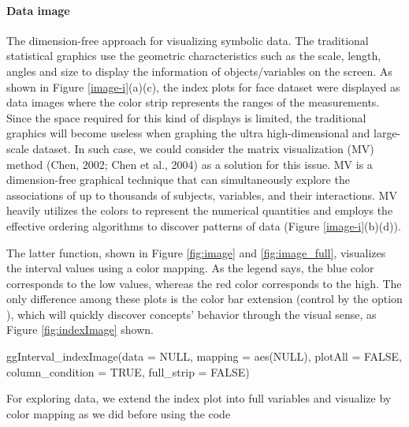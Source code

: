 \documentclass[article]{jss}
\begin{document}
 



\paragraph{Data image}
The dimension-free approach for visualizing symbolic data.
The traditional statistical graphics use the geometric
characteristics such as the scale, length, angles and size
to display the information of objects/variables on the
screen. As shown in Figure \ref{image-i}(a)(c), the index
plots for face dataset were displayed as data images where
the color strip represents the ranges of the measurements.
Since the space required for this kind of displays is
limited, the traditional graphics will become useless when
graphing the ultra high-dimensional and large-scale
dataset. In such case, we could consider the matrix
visualization (MV) method (Chen, 2002; Chen et al., 2004)
as a solution for this issue. MV is a dimension-free
graphical technique that can simultaneously explore the
associations of up to thousands of subjects, variables, and
their interactions. MV heavily utilizes the colors to
represent the numerical quantities and employs the
effective ordering algorithms to discover patterns of data
(Figure \ref{image-i}(b)(d)).

The latter function, shown in Figure \ref{fig:image} and \ref{fig:image_full}, visualizes the interval values using a color mapping. As the legend says, the blue color corresponds to the low values, whereas the red color corresponds to the high. The only difference among these plots is the color bar extension (control by the option ), which will quickly discover concepts' behavior through the visual sense, as Figure \ref{fig:indexImage} shown.



\begin{CodeChunk}
\begin{CodeInput}
ggInterval_indexImage(data = NULL, mapping = aes(NULL), plotAll = FALSE,
  column_condition = TRUE, full_strip = FALSE)
\end{CodeInput}
\end{CodeChunk}


For exploring data, we extend the index plot into full variables and visualize by color mapping as we did before using the code
\end{document}
